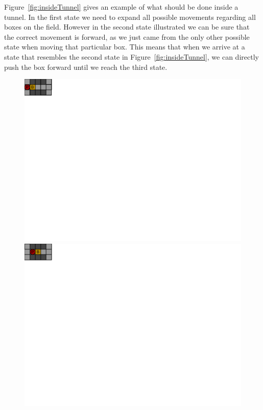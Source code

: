 \documentclass[a4paper,11pt]{article}
\renewcommand{\*}[0]{\cdot}
\begin{document}
Figure~\ref{fig:insideTunnel} gives an example of what should be done inside a
tunnel. In the first state we need to expand all possible movements regarding
all boxes on the field. However in the second state illustrated we can be sure
that the correct movement is forward, as we just came from the only other
possible state when moving that particular box. This means that when we arrive
at a state that resembles the second state in Figure~\ref{fig:insideTunnel}, we
can directly push the box forward until we reach the third state.

\begin{figure}[h!]
    \begin{center}
        \includegraphics{figures/insideTunnel1}
        \includegraphics{figures/insideTunnel2}

\end{center}
\end{figure}
\end{document}
